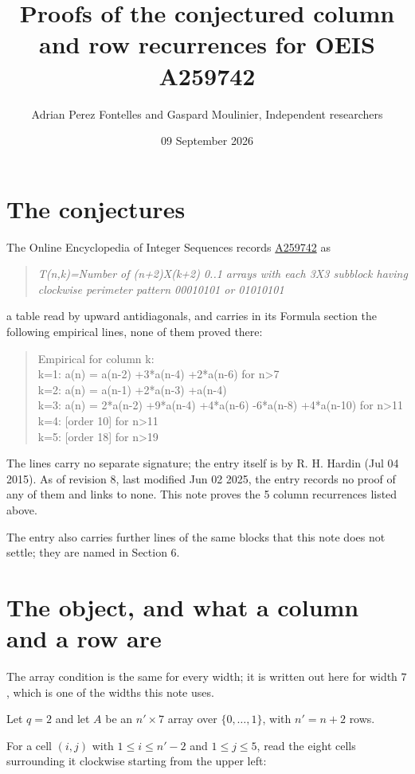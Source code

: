 \documentclass[11pt]{article}
\title{Proofs of the conjectured column and row recurrences for OEIS A259742}
\author{Adrian Perez Fontelles and Gaspard Moulinier, Independent researchers}
\date{09 September 2026}
\theoremstyle{definition}
\begin{document}
\maketitle
\section{The conjectures}

The Online Encyclopedia of Integer Sequences records \href{https://oeis.org/A259742}{A259742} as

\begin{quote}\itshape T(n,k)=Number of (n+2)X(k+2) 0..1 arrays with each 3X3 subblock having clockwise perimeter pattern 00010101 or 01010101\end{quote}

a table read by upward antidiagonals, and carries in its Formula section the following empirical lines, none of them proved there:

\begin{quote}\ttfamily Empirical for column k:\\
k=1: a(n) = a(n-2) +3*a(n-4) +2*a(n-6) for n>7\\k=2: a(n) = a(n-1) +2*a(n-3) +a(n-4)\\k=3: a(n) = 2*a(n-2) +9*a(n-4) +4*a(n-6) -6*a(n-8) +4*a(n-10) for n>11\\k=4: [order 10] for n>11\\k=5: [order 18] for n>19\end{quote}

The lines carry no separate signature; the entry itself is by R. H. Hardin (Jul 04 2015). As of revision 8, last modified Jun 02 2025, the entry records no proof of any of them and links to none. This note proves the 5 column recurrences listed above.

The entry also carries further lines of the same blocks that this note does not settle; they are named in Section 6.

\section{The object, and what a column and a row are}

The array condition is the same for every width; it is written out here for width $7$, which is one of the widths this note uses.

Let $q = 2$ and let $A$ be an $n' \times 7$ array over $\{0,\dots,1\}$, with $n' = n + 2$ rows.

For a cell $(i,j)$ with $1 \le i \le n'-2$ and $1 \le j \le 5$, read the eight cells surrounding it clockwise starting from the upper left:
\end{document}
